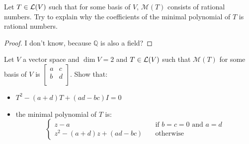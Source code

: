 \documentclass[../main.tex]{subfiles}
\begin{document}
\begin{exercise}
  Let $T \in \mathcal{L}(V)$ such that for some basis of $V$, $\mathcal{M}(T)$ consists of
  rational numbers. Try to explain why the coefficients of the minimal polynomial of $T$
  is rational numbers.
\end{exercise}
\begin{proof}
  I don't know, because $\mathbb{Q}$ is also a field?
\end{proof}

\setcounter{exercise}{10}
\begin{exercise}
  Let $V$ a vector space and $\dim V = 2$ and $T \in \mathcal{L}(V)$ such that $\mathcal{M}(T)$
  for some basis of $V$ is $\begin{bmatrix}
    a & c \\
    b & d \\
  \end{bmatrix}$.
  Show that:
  \begin{itemize}
    \item $T^2 - (a + d)T + (ad - bc)I = 0$
    \item the minimal polynomial of $T$ is:
          \[
          \begin{cases}
            z - a \quad & \text{if } b = c = 0 \text{ and } a = d \\
            z^2 - (a + d) z + (ad - bc) \quad & \text{otherwise}
          \end{cases}
          \]
  \end{itemize}
\end{exercise}
\end{document}
